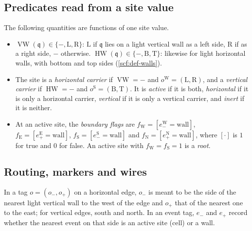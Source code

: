 \subsection{Predicates read from a site value}\label{int:sub-predicates}

The following quantities are functions of one site value.
\begin{itemize}
\item $\operatorname{VW}(\mathfrak q)\in\{-,\mathrm L,\mathrm R\}$: $\mathrm L$ if $\mathfrak q$ lies on a light vertical wall as a left side, $\mathrm R$ if as a right side, $-$ otherwise. $\operatorname{HW}(\mathfrak q)\in\{-,\mathrm B,\mathrm T\}$: likewise for light horizontal walls, with bottom and top sides (\cref{scf:def-walls}).
\item The site is a \emph{horizontal carrier} if $\operatorname{VW}=-$ and $o^{\mathrm W}=(\mathrm L,\mathrm R)$, and a \emph{vertical carrier} if $\operatorname{HW}=-$ and $o^{\mathrm S}=(\mathrm B,\mathrm T)$. It is \emph{active} if it is both, \emph{horizontal} if it is only a horizontal carrier, \emph{vertical} if it is only a vertical carrier, and \emph{inert} if it is neither.
\item At an active site, the \emph{boundary flags} are $f_{\mathrm W}=[e^{\mathrm W}_-=\mathrm{wall}]$, $f_{\mathrm E}=[e^{\mathrm E}_+=\mathrm{wall}]$, $f_{\mathrm S}=[e^{\mathrm S}_-=\mathrm{wall}]$ and $f_{\mathrm N}=[e^{\mathrm N}_+=\mathrm{wall}]$, where $[\cdot]$ is $1$ for true and $0$ for false. An active site with $f_{\mathrm W}=f_{\mathrm S}=1$ is a \emph{root}.
\end{itemize}

\subsection{Routing, markers and wires}\label{int:sub-routing}

In a tag $o=(o_-,o_+)$ on a horizontal edge, $o_-$ is meant to be the side of the nearest light vertical wall to the west of the edge and $o_+$ that of the nearest one to the east; for vertical edges, south and north. In an event tag, $e_-$ and $e_+$ record whether the nearest event on that side is an active site ($\mathrm{cell}$) or a wall.

